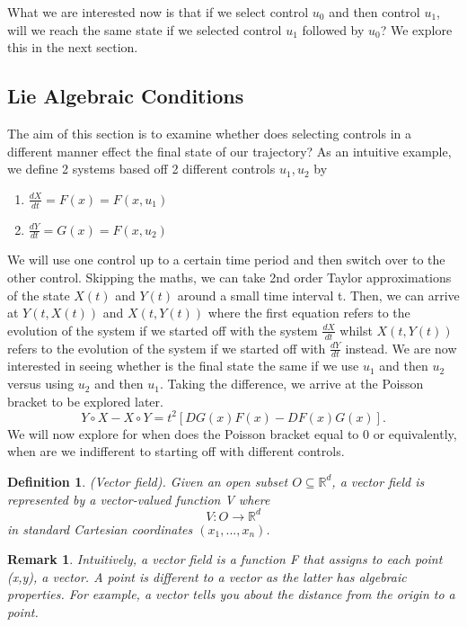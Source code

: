 \documentclass[twoside]{article}
\newtheorem{remark}[theorem]{Remark}
\newtheorem{definition}[theorem]{Definition}
\begin{document}
What we are interested now is that if we select control $u_0$ and then control $u_1$, will we reach the same state if we selected control $u_1$ followed by $u_0$? We explore this in the next section.

\subsection{Lie Algebraic Conditions}
The aim of this section is to examine whether does selecting controls in a different manner effect the final state of our trajectory? As an intuitive example, we define 2 systems based off 2 different controls $u_1, u_2$ by 

\begin{enumerate}
\item $\frac{dX}{dt} = F(x) = F(x,u_1)$
\item $\frac{dY}{dt} = G(x) = F(x,u_2)$
\end{enumerate}

We will use one control up to a certain time period and then switch over to the other control. Skipping the maths, we can take 2nd order Taylor approximations of the state $X(t)$ and $Y(t)$ around a small time interval t. Then, we can arrive at $Y(t,X(t))$ and $X(t,Y(t))$ where the first equation refers to the evolution of the system if we started off with the system $\frac{dX}{dt}$ whilst $X(t,Y(t))$ refers to the evolution of the system if we started off with $\frac{dY}{dt}$ instead. We are now interested in seeing whether is the final state the same if we use $u_1$ and then $u_2$ versus using $u_2$ and then $u_1$. Taking the difference, we arrive at the Poisson bracket to be explored later.
$$
Y \circ X - X \circ Y = t^2[DG(x)F(x) - DF(x)G(x)].
$$
We will now explore for when does the Poisson bracket equal to 0 or equivalently, when are we indifferent to starting off with different controls.
\\

\begin{definition}(Vector field). Given an open subset $O \subseteq \mathbb{R}^d$, a vector field is represented by a vector-valued function V where 
$$
V: O \rightarrow \mathbb{R}^d
$$
in standard Cartesian coordinates $(x_1,...,x_n)$.
\end{definition}

\begin{remark}Intuitively, a vector field is a function F that assigns to each point (x,y), a vector. A point is different to a vector as the latter has algebraic properties. For example, a vector tells you about the distance from the origin to a point.
\end{remark}
\end{document}
